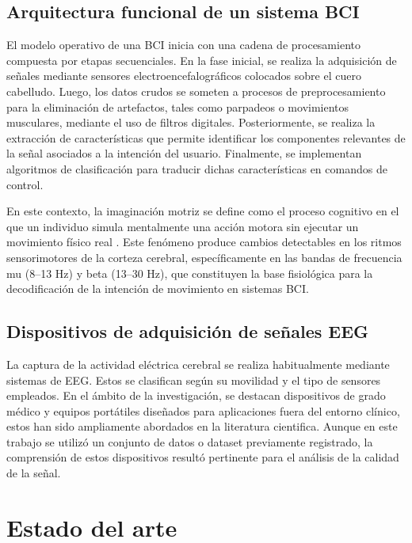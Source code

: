 \subsection{Arquitectura funcional de un sistema BCI}

El modelo operativo de una BCI inicia con una cadena de procesamiento compuesta por etapas secuenciales. En la fase inicial, se realiza la adquisición de señales mediante sensores electroencefalográficos colocados sobre el cuero cabelludo. Luego, los datos crudos se someten a procesos de preprocesamiento para la eliminación de artefactos, tales como parpadeos o movimientos musculares, mediante el uso de filtros digitales. Posteriormente, se realiza la extracción de características que permite identificar los componentes relevantes de la señal asociados a la intención del usuario. Finalmente, se implementan algoritmos de clasificación para traducir dichas características en comandos de control.

En este contexto, la imaginación motriz se define como el proceso cognitivo en el que un individuo simula mentalmente una acción motora sin ejecutar un movimiento físico real \cite{pfurtscheller2001motor}. Este fenómeno produce cambios detectables en los ritmos sensorimotores de la corteza cerebral, específicamente en las bandas de frecuencia mu (8--13 Hz) y beta (13--30 Hz), que constituyen la base fisiológica para la decodificación de la intención de movimiento en sistemas BCI.

\subsection{Dispositivos de adquisición de señales EEG}

La captura de la actividad eléctrica cerebral se realiza habitualmente mediante sistemas de EEG. Estos se clasifican según su movilidad y el tipo de sensores empleados. En el ámbito de la investigación, se destacan dispositivos de grado médico y equipos portátiles diseñados para aplicaciones fuera del entorno clínico, estos han sido ampliamente abordados en la literatura cientifica\cite{casson2010wearable}.
Aunque en este trabajo se utilizó un conjunto de datos o dataset previamente registrado, la comprensión de estos dispositivos resultó pertinente para el análisis de la calidad de la señal.


\section{Estado del arte}

